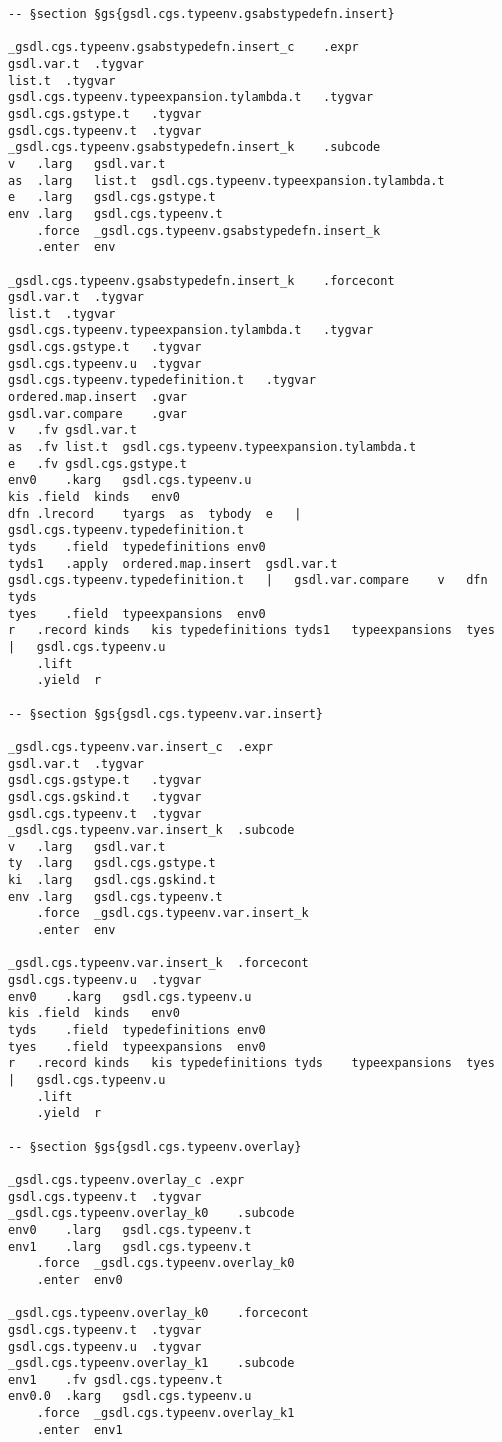 \documentclass{report}
\begin{document}
\begin{verbatim}
-- §section §gs{gsdl.cgs.typeenv.gsabstypedefn.insert}

_gsdl.cgs.typeenv.gsabstypedefn.insert_c	.expr
gsdl.var.t	.tygvar
list.t	.tygvar
gsdl.cgs.typeenv.typeexpansion.tylambda.t	.tygvar
gsdl.cgs.gstype.t	.tygvar
gsdl.cgs.typeenv.t	.tygvar
_gsdl.cgs.typeenv.gsabstypedefn.insert_k	.subcode
v	.larg	gsdl.var.t
as	.larg	list.t	gsdl.cgs.typeenv.typeexpansion.tylambda.t
e	.larg	gsdl.cgs.gstype.t
env	.larg	gsdl.cgs.typeenv.t
	.force	_gsdl.cgs.typeenv.gsabstypedefn.insert_k
	.enter	env

_gsdl.cgs.typeenv.gsabstypedefn.insert_k	.forcecont
gsdl.var.t	.tygvar
list.t	.tygvar
gsdl.cgs.typeenv.typeexpansion.tylambda.t	.tygvar
gsdl.cgs.gstype.t	.tygvar
gsdl.cgs.typeenv.u	.tygvar
gsdl.cgs.typeenv.typedefinition.t	.tygvar
ordered.map.insert	.gvar
gsdl.var.compare	.gvar
v	.fv	gsdl.var.t
as	.fv	list.t	gsdl.cgs.typeenv.typeexpansion.tylambda.t
e	.fv	gsdl.cgs.gstype.t
env0	.karg	gsdl.cgs.typeenv.u
kis	.field	kinds	env0
dfn	.lrecord	tyargs	as	tybody	e	|	gsdl.cgs.typeenv.typedefinition.t
tyds	.field	typedefinitions	env0
tyds1	.apply	ordered.map.insert	gsdl.var.t	gsdl.cgs.typeenv.typedefinition.t	|	gsdl.var.compare	v	dfn	tyds
tyes	.field	typeexpansions	env0
r	.record	kinds	kis	typedefinitions	tyds1	typeexpansions	tyes	|	gsdl.cgs.typeenv.u
	.lift
	.yield	r

-- §section §gs{gsdl.cgs.typeenv.var.insert}

_gsdl.cgs.typeenv.var.insert_c	.expr
gsdl.var.t	.tygvar
gsdl.cgs.gstype.t	.tygvar
gsdl.cgs.gskind.t	.tygvar
gsdl.cgs.typeenv.t	.tygvar
_gsdl.cgs.typeenv.var.insert_k	.subcode
v	.larg	gsdl.var.t
ty	.larg	gsdl.cgs.gstype.t
ki	.larg	gsdl.cgs.gskind.t
env	.larg	gsdl.cgs.typeenv.t
	.force	_gsdl.cgs.typeenv.var.insert_k
	.enter	env

_gsdl.cgs.typeenv.var.insert_k	.forcecont
gsdl.cgs.typeenv.u	.tygvar
env0	.karg	gsdl.cgs.typeenv.u
kis	.field	kinds	env0
tyds	.field	typedefinitions	env0
tyes	.field	typeexpansions	env0
r	.record	kinds	kis	typedefinitions	tyds	typeexpansions	tyes	|	gsdl.cgs.typeenv.u
	.lift
	.yield	r

-- §section §gs{gsdl.cgs.typeenv.overlay}

_gsdl.cgs.typeenv.overlay_c	.expr
gsdl.cgs.typeenv.t	.tygvar
_gsdl.cgs.typeenv.overlay_k0	.subcode
env0	.larg	gsdl.cgs.typeenv.t
env1	.larg	gsdl.cgs.typeenv.t
	.force	_gsdl.cgs.typeenv.overlay_k0
	.enter	env0

_gsdl.cgs.typeenv.overlay_k0	.forcecont
gsdl.cgs.typeenv.t	.tygvar
gsdl.cgs.typeenv.u	.tygvar
_gsdl.cgs.typeenv.overlay_k1	.subcode
env1	.fv	gsdl.cgs.typeenv.t
env0.0	.karg	gsdl.cgs.typeenv.u
	.force	_gsdl.cgs.typeenv.overlay_k1
	.enter	env1


\end{verbatim}
\end{document}
